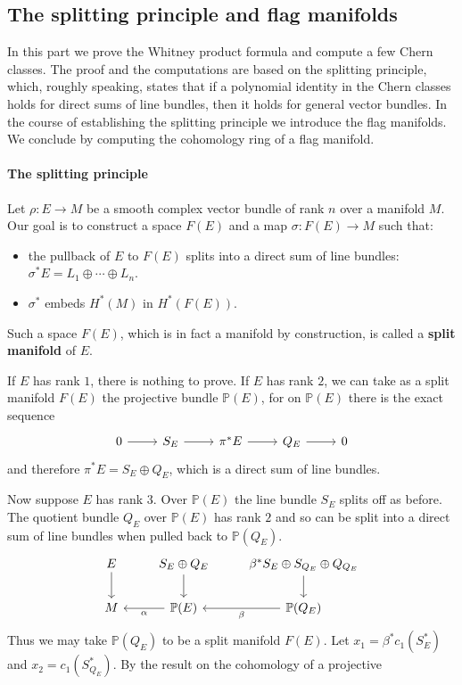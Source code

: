 \subsection{The splitting principle and flag manifolds}
In this part we prove the Whitney product formula and compute a few Chern classes. The proof and the computations are based on the splitting principle, which, roughly 
speaking, states that if a polynomial identity in the Chern classes holds for direct sums of line bundles, then it holds for general vector bundles. In the course of 
establishing the splitting principle we introduce the flag manifolds. We conclude by computing the cohomology ring of a flag manifold.
\paragraph{The splitting principle}
Let $\rho:E\to M$ be a smooth complex vector bundle of rank $n$ over a manifold $M$. Our goal is to construct a space $F(E)$ and a map $\sigma:F(E)\to M$ such that:
\begin{itemize}
\item the pullback of $E$ to $F(E)$ splits into a direct sum of line bundles: $\sigma^*E=L_1\oplus\cdots\oplus L_n$.
\item $\sigma^*$ embeds $H^*(M)$ in $H^*(F(E))$.
\end{itemize}
Such a space $F(E)$, which is in fact a manifold by construction, is called a \textbf{split manifold} of $E$.\par
If $E$ has rank $1$, there is nothing to prove. If $E$ has rank $2$, we can take as a split manifold $F(E)$ the projective bundle $\mathbb{P}(E)$, for on $\mathbb{P}(E)$ 
there is the exact sequence
\[\begin{tikzcd}
0\ar[r]&S_E\ar[r]&\pi^*E\ar[r]&Q_E\ar[r]&0
\end{tikzcd}\]
and therefore $\pi^*E=S_E\oplus Q_E$, which is a direct sum of line bundles.\par
Now suppose $E$ has rank $3$. Over $\mathbb{P}(E)$ the line bundle $S_E$ splits off as before. The quotient bundle $Q_E$ over $\mathbb{P}(E)$ has rank $2$ and so can be 
split into a direct sum of line bundles when pulled back to $\mathbb{P}(Q_E)$.
\[\begin{tikzcd}
E\ar[d]&S_E\oplus Q_E\ar[d]&\beta^*S_E\oplus S_{Q_E}\oplus Q_{Q_E}\ar[d]\\
M&\mathbb{P}(E)\ar[l,"\alpha"]&\mathbb{P}(Q_E)\ar[l,"\beta"]
\end{tikzcd}\]
Thus we may take $\mathbb{P}(Q_E)$ to be a split manifold $F(E)$. Let $x_1=\beta^*c_1(S_E^*)$ and $x_2=c_1(S_{Q_E}^*)$. By the result on the cohomology of a projective 

